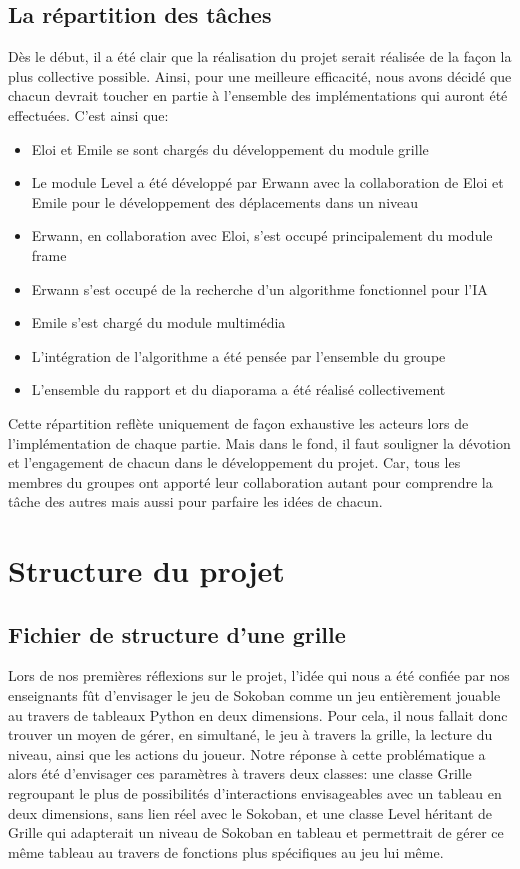 \documentclass[a4paper,12pt]{article} %
\begin{document}
\subsection{La répartition des tâches}

Dès le début, il a été clair que la réalisation du projet serait réalisée de la façon la plus collective possible. Ainsi, pour une meilleure efficacité, nous avons décidé que chacun devrait toucher en partie à l'ensemble des implémentations qui auront été effectuées.
C'est ainsi que:
\begin{itemize}
	\item Eloi et Emile se sont chargés du développement du module grille
	\item Le module Level a été développé par Erwann avec la collaboration de Eloi et Emile pour le développement des déplacements dans un niveau
	\item Erwann, en collaboration avec Eloi, s'est occupé principalement du module frame
	\item Erwann s'est occupé de la recherche d'un algorithme fonctionnel pour l'IA
	\item Emile s'est chargé du module multimédia
	\item L'intégration de l'algorithme a été pensée par l'ensemble du groupe 
	\item L'ensemble du rapport et du diaporama a été réalisé collectivement
\end{itemize}
Cette répartition reflète uniquement de façon exhaustive les acteurs lors de l'implémentation de chaque partie. Mais dans le fond, il faut souligner la dévotion et l'engagement de chacun
dans le développement du projet. Car, tous les membres du groupes ont apporté leur collaboration autant pour comprendre la tâche des autres mais aussi pour parfaire les idées de chacun.

\section{Structure du projet}

\subsection{Fichier de structure d'une grille}

Lors de nos premières réflexions sur le projet, l'idée qui nous a été confiée par nos enseignants fût d'envisager le jeu de Sokoban comme un jeu entièrement jouable au travers de tableaux Python en deux dimensions. Pour cela, il nous fallait donc trouver un moyen de gérer, en simultané, le jeu à travers la grille, la lecture du niveau, ainsi que les actions du joueur. Notre réponse à cette problématique a alors été d'envisager ces paramètres à travers deux classes: une classe Grille regroupant le plus de possibilités d'interactions envisageables avec un tableau en deux dimensions, sans lien réel avec le Sokoban, et une classe Level héritant de Grille qui adapterait un niveau de Sokoban en tableau et permettrait de gérer ce même tableau au travers de fonctions plus spécifiques au jeu lui même.
\end{document}
